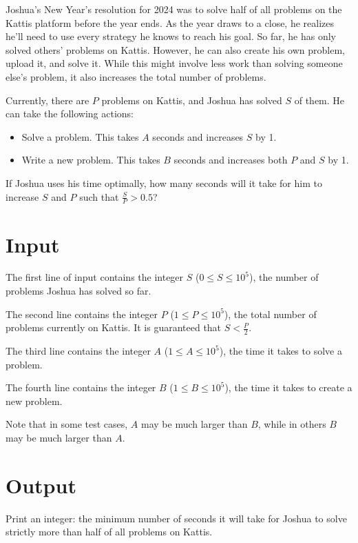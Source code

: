 
Joshua's New Year's resolution for 2024 was to solve half of all problems on the Kattis platform before the year ends. 
As the year draws to a close, he realizes he'll need to use every strategy he knows to reach his goal. 
So far, he has only solved others' problems on Kattis. However, he can also create his own problem, upload it, and solve it. 
While this might involve less work than solving someone else's problem, it also increases the total number of problems.

Currently, there are $P$ problems on Kattis, and Joshua has solved $S$ of them. He can take the following actions:

\begin{itemize}
  \item Solve a problem. This takes $A$ seconds and increases $S$ by 1.
  \item Write a new problem. This takes $B$ seconds and increases both $P$ and $S$ by 1.
\end{itemize}

If Joshua uses his time optimally, how many seconds will it take for him to increase $S$ and $P$ such that 
$\frac{S}{P} > 0.5$?

\section*{Input}
The first line of input contains the integer $S$ ($0 \leq S \leq 10^5$), the number of problems Joshua has solved so far.

The second line contains the integer $P$ ($1 \leq P \leq 10^5$), the total number of problems currently on Kattis. 
It is guaranteed that $S < \frac{P}{2}$.

The third line contains the integer $A$ ($1 \leq A \leq 10^5$), the time it takes to solve a problem.

The fourth line contains the integer $B$ ($1 \leq B \leq 10^5$), the time it takes to create a new problem.

Note that in some test cases, $A$ may be much larger than $B$, while in others $B$ may be much larger than $A$.

\section*{Output}
Print an integer: the minimum number of seconds it will take for Joshua to solve strictly more than half 
of all problems on Kattis.


